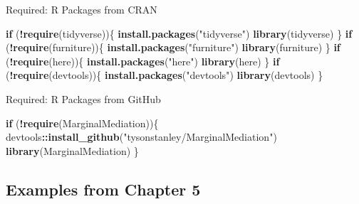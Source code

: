 \documentclass[]{DissertateCUNY}
\newenvironment{Shaded}{\begin{snugshade}}{\end{snugshade}}
\newcommand{\ControlFlowTok}[1]{\textcolor[rgb]{0.13,0.29,0.53}{\textbf{#1}}}
\newcommand{\KeywordTok}[1]{\textcolor[rgb]{0.13,0.29,0.53}{\textbf{#1}}}
\newcommand{\NormalTok}[1]{#1}
\newcommand{\OperatorTok}[1]{\textcolor[rgb]{0.81,0.36,0.00}{\textbf{#1}}}
\newcommand{\StringTok}[1]{\textcolor[rgb]{0.31,0.60,0.02}{#1}}
\begin{document}
\singlespace

Required: R Packages from CRAN

\small

\begin{Shaded}
\begin{Highlighting}[]
\ControlFlowTok{if}\NormalTok{ (}\OperatorTok{!}\KeywordTok{require}\NormalTok{(tidyverse))\{}
  \KeywordTok{install.packages}\NormalTok{(}\StringTok{"tidyverse"}\NormalTok{)}
  \KeywordTok{library}\NormalTok{(tidyverse)}
\NormalTok{\}}
\ControlFlowTok{if}\NormalTok{ (}\OperatorTok{!}\KeywordTok{require}\NormalTok{(furniture))\{}
  \KeywordTok{install.packages}\NormalTok{(}\StringTok{"furniture"}\NormalTok{)}
  \KeywordTok{library}\NormalTok{(furniture)}
\NormalTok{\}}
\ControlFlowTok{if}\NormalTok{ (}\OperatorTok{!}\KeywordTok{require}\NormalTok{(here))\{}
  \KeywordTok{install.packages}\NormalTok{(}\StringTok{"here"}\NormalTok{)}
  \KeywordTok{library}\NormalTok{(here)}
\NormalTok{\}}
\ControlFlowTok{if}\NormalTok{ (}\OperatorTok{!}\KeywordTok{require}\NormalTok{(devtools))\{}
  \KeywordTok{install.packages}\NormalTok{(}\StringTok{"devtools"}\NormalTok{)}
  \KeywordTok{library}\NormalTok{(devtools)}
\NormalTok{\}}
\end{Highlighting}
\end{Shaded}

\normalsize

Required: R Packages from GitHub

\small

\begin{Shaded}
\begin{Highlighting}[]
\ControlFlowTok{if}\NormalTok{ (}\OperatorTok{!}\KeywordTok{require}\NormalTok{(MarginalMediation))\{}
\NormalTok{  devtools}\OperatorTok{::}\KeywordTok{install_github}\NormalTok{(}\StringTok{"tysonstanley/MarginalMediation"}\NormalTok{)}
  \KeywordTok{library}\NormalTok{(MarginalMediation)}
\NormalTok{\}}
\end{Highlighting}
\end{Shaded}

\normalsize

\clearpage

\hypertarget{examples-from-chapter-5}{%
\subsection*{Examples from Chapter 5}\label{examples-from-chapter-5}}
\end{document}
